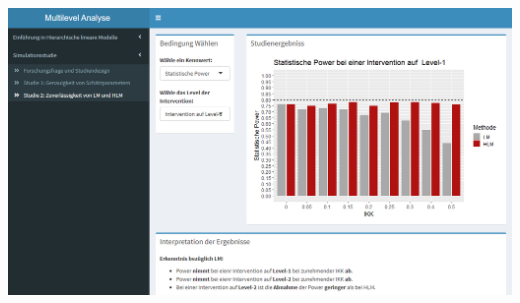 \documentclass[12pt]{article}\usepackage[]{graphicx}\usepackage[]{color}
\begin{document}
\begin{center}
\includegraphics[scale=0.5]{./figures/app_study2}
\end{center}
\end{document}

